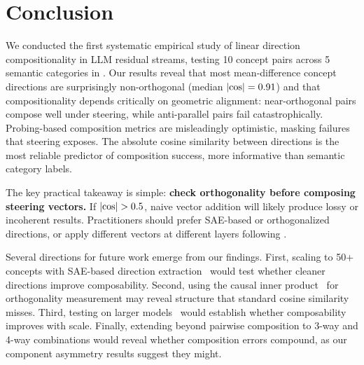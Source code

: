 \section{Conclusion}
\label{sec:conclusion}

We conducted the first systematic empirical study of linear direction
compositionality in LLM residual streams, testing 10 concept pairs across 5
semantic categories in \pythia. Our results reveal that most mean-difference
concept directions are surprisingly non-orthogonal (median $|\text{cos}| = 0.91$)
and that compositionality depends critically on geometric alignment: near-orthogonal
pairs compose well under steering, while anti-parallel pairs fail
catastrophically. Probing-based composition metrics are misleadingly optimistic,
masking failures that steering exposes. The absolute cosine similarity between
directions is the most reliable predictor of composition success, more
informative than semantic category labels.

The key practical takeaway is simple: \textbf{check orthogonality before
composing steering vectors.} If $|\text{cos}| > 0.5$, naive vector addition will
likely produce lossy or incoherent results. Practitioners should prefer
SAE-based or orthogonalized directions, or apply different vectors at different
layers following \citet{stolfo2024improving}.

Several directions for future work emerge from our findings. First, scaling to
50+ concepts with SAE-based direction extraction~\citep{chalnev2024improving}
would test whether cleaner directions improve composability. Second, using the
causal inner product~\citep{park2023linear} for orthogonality measurement may
reveal structure that standard cosine similarity misses. Third, testing on
larger models~\citep{todd2023function} would establish whether composability
improves with scale. Finally, extending beyond pairwise composition to 3-way
and 4-way combinations would reveal whether composition errors compound, as our
component asymmetry results suggest they might.
